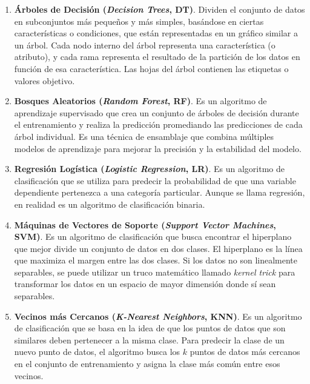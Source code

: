 \begin{enumerate}
    \item \textbf{Árboles de Decisión (\textit{Decision Trees}, DT)}. Dividen el conjunto de datos
    en subconjuntos más pequeños y más simples, basándose en ciertas características o condiciones,
    que están representadas en un gráfico similar a un árbol. Cada nodo interno del árbol
    representa una característica (o atributo), y cada rama representa el resultado de la
    partición de los datos en función de esa característica. Las hojas del árbol contienen las
    etiquetas o valores objetivo.\\
    \item \textbf{Bosques Aleatorios (\textit{Random Forest}, RF)}. Es un algoritmo de aprendizaje
    supervisado que crea un conjunto de árboles de decisión durante el entrenamiento y realiza
    la predicción promediando las predicciones de cada árbol individual. Es una técnica de
    ensamblaje que combina múltiples modelos de aprendizaje para mejorar la precisión y la
    estabilidad del modelo.\\
    \item \textbf{Regresión Logística (\textit{Logistic Regression}, LR)}. Es un algoritmo de
    clasificación que se utiliza para predecir la probabilidad de que una variable dependiente
    pertenezca a una categoría particular. Aunque se llama regresión, en realidad es un algoritmo
    de clasificación binaria.\\
    \item \textbf{Máquinas de Vectores de Soporte (\textit{Support Vector Machines}, SVM)}. Es un
    algoritmo de clasificación que busca encontrar el hiperplano que mejor divide un conjunto de
    datos en dos clases. El hiperplano es la línea que maximiza el margen entre las dos clases. Si
    los datos no son linealmente separables, se puede utilizar un truco matemático llamado
    \textit{kernel trick} para transformar los datos en un espacio de mayor dimensión donde sí
    sean separables.\\
    \item \textbf{Vecinos más Cercanos (\textit{K-Nearest Neighbors}, KNN)}. Es un algoritmo de
    clasificación que se basa en la idea de que los puntos de datos que son similares deben
    pertenecer a la misma clase. Para predecir la clase de un nuevo punto de datos, el algoritmo
    busca los $k$ puntos de datos más cercanos en el conjunto de entrenamiento y asigna la clase
    más común entre esos vecinos.\\

\end{enumerate}
